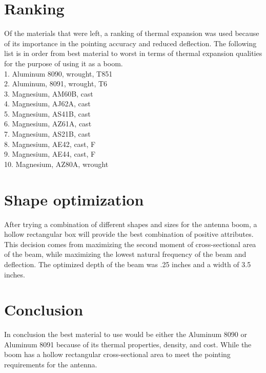 \documentclass[12pt]{report}
\begin{document}
\section{Ranking}
Of the materials that were left, a ranking of thermal expansion was used because of its importance in the pointing accuracy and reduced deflection. The following list is in order from best material to worst in terms of thermal expansion qualities for the purpose of using it as a boom. \\
1. Aluminum 8090, wrought, T851\\
2. Aluminum, 8091, wrought, T6\\
3. Magnesium, AM60B, cast\\
4. Magnesium, AJ62A, cast\\
5. Magnesium, AS41B, cast\\
6. Magnesium, AZ61A, cast\\
7. Magnesium, AS21B, cast\\
8. Magnesium, AE42, cast, F\\
9. Magnesium, AE44, cast, F\\
10. Magnesium, AZ80A, wrought\\

\section{Shape optimization}

After trying a combination of different shapes and sizes for the antenna boom, a hollow rectangular box will provide the best combination of positive attributes. This decision comes from maximizing the second moment of cross-sectional area of the beam, while maximizing the lowest natural frequency of the beam and deflection. The optimized depth of the beam was .25 inches and a width of 3.5 inches.


\section{Conclusion}
In conclusion the best material to use would be either the Aluminum 8090 or Aluminum 8091 because of its thermal properties, density, and cost. While the boom has a hollow rectangular cross-sectional area to meet the pointing requirements for the antenna. 
\end{document}
